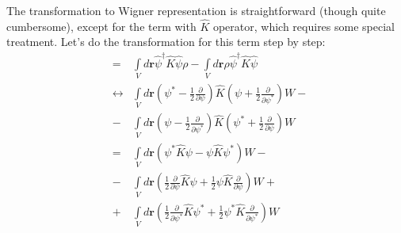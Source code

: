 \documentclass[12pt,notitlepage]{report}
\begin{document}
The transformation to Wigner representation is straightforward (though quite cumbersome), except for the term with $\hat{K}$ operator, which requires some special treatment. Let's do the transformation for this term step by step:
\begin{eqnarray}
[ \int\limits_V \hat{\psi}^\dagger \hat{K} \hat{\psi}, \rho ]
& = & \int\limits_V d\textbf{r} \hat{\psi}^\dagger \hat{K} \hat{\psi} \rho - \int\limits_V d\textbf{r} \rho \hat{\psi}^\dagger \hat{K} \hat{\psi} \nonumber \\
& \leftrightarrow & \int\limits_V d\textbf{r} \left( \psi^* - \frac{1}{2}\frac{\partial}{\partial\psi}\right) \hat{K} \left( \psi + \frac{1}{2}\frac{\partial}{\partial\psi^*} \right) W - \nonumber \\
& - & \int\limits_V d\textbf{r} \left( \psi - \frac{1}{2}\frac{\partial}{\partial\psi^*}\right) \hat{K} \left( \psi^* + \frac{1}{2}\frac{\partial}{\partial\psi}  \right) W \nonumber \\
& = & \int\limits_V d\textbf{r} \left( \psi^* \hat{K} \psi - \psi \hat{K} \psi^* \right) W -  \label{annihilating_psi_K_psi} \\
& - & \int\limits_V d\textbf{r} \left( \frac{1}{2}\frac{\partial}{\partial\psi} \hat{K} \psi +
\frac{1}{2} \psi \hat{K} \frac{\partial}{\partial\psi} \right) W + \label{dpsi_K_psi_term} \\
& + & \int\limits_V d\textbf{r} \left( \frac{1}{2}\frac{\partial}{\partial\psi^*} \hat{K} \psi^* +
\frac{1}{2} \psi^* \hat{K} \frac{\partial}{\partial\psi^*} \label{dpsi_star_K_psi_star_term} \right) W
\end{eqnarray}
\end{document}
